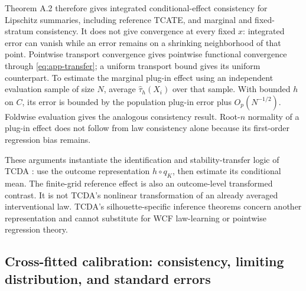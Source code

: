Theorem A.2 therefore gives integrated conditional-effect consistency for Lipschitz summaries, including reference TCATE, and marginal and fixed-stratum consistency. It does not give convergence at every fixed $x$: integrated error can vanish while an error remains on a shrinking neighborhood of that point. Pointwise transport convergence gives pointwise functional convergence through \eqref{eq:app-transfer}; a uniform transport bound gives its uniform counterpart. To estimate the marginal plug-in effect using an independent evaluation sample of size $N$, average $\widehat\tau_h(X_i)$ over that sample. With bounded $h$ on $C$, its error is bounded by the population plug-in error plus $O_p(N^{-1/2})$. Foldwise evaluation gives the analogous consistency result. Root-$n$ normality of a plug-in effect does not follow from law consistency alone because its first-order regression bias remains.

These arguments instantiate the identification and stability-transfer logic of TCDA \citep[Theorem 5.1 and Definition 5.2]{souto_diamantis_tcda_2026}: use the outcome representation $h\circ q_K$, then estimate its conditional mean. The finite-grid reference effect is also an outcome-level transformed contrast. It is not TCDA's nonlinear transformation of an already averaged interventional law. TCDA's silhouette-specific inference theorems concern another representation and cannot substitute for WCF law-learning or pointwise regression theory.

\subsection{Cross-fitted calibration: consistency, limiting distribution, and standard errors}

